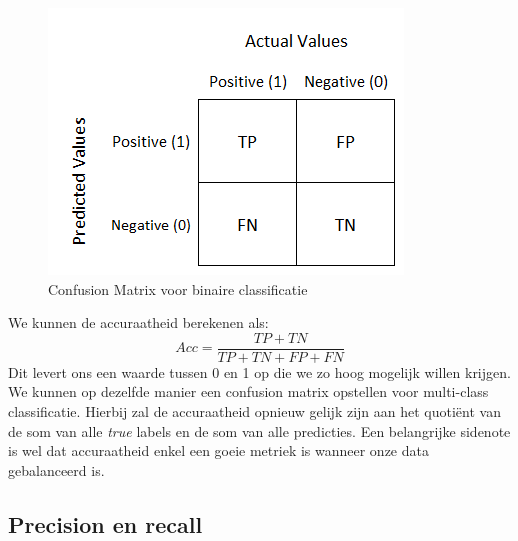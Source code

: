 \begin{figure}[h]
	\centering
	\includegraphics[width=0.4\linewidth]{images/27-confusion-matrix.png}
	\caption{Confusion Matrix voor binaire classificatie}
	\label{fig:confusion-matrix}
\end{figure}
\noindent
We kunnen de accuraatheid berekenen als:
\begin{equation}
	Acc = \frac{TP + TN}{TP + TN + FP + FN}
\end{equation}
\noindent
Dit levert ons een waarde tussen 0 en 1 op die we zo hoog mogelijk willen krijgen. \\
\newline
We kunnen op dezelfde manier een confusion matrix opstellen voor multi-class classificatie. Hierbij zal de accuraatheid opnieuw gelijk zijn aan het quotiënt van de som van alle \textit{true} labels en de som van alle predicties. Een belangrijke sidenote is wel dat accuraatheid enkel een goeie metriek is wanneer onze data gebalanceerd is. 

\subsection{Precision en recall}

